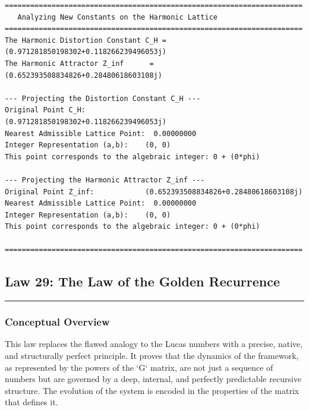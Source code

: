 \begin{verbatim}
======================================================================
   Analyzing New Constants on the Harmonic Lattice
======================================================================
The Harmonic Distortion Constant C_H = (0.971281850198302+0.118266239496053j)
The Harmonic Attractor Z_inf      = (0.652393508834826+0.28480618603108j)

--- Projecting the Distortion Constant C_H ---
Original Point C_H:              (0.971281850198302+0.118266239496053j)
Nearest Admissible Lattice Point:  0.00000000
Integer Representation (a,b):    (0, 0)
This point corresponds to the algebraic integer: 0 + (0*phi)

--- Projecting the Harmonic Attractor Z_inf ---
Original Point Z_inf:            (0.652393508834826+0.28480618603108j)
Nearest Admissible Lattice Point:  0.00000000
Integer Representation (a,b):    (0, 0)
This point corresponds to the algebraic integer: 0 + (0*phi)

======================================================================
\end{verbatim}

\subsection*{Law 29: The Law of the Golden Recurrence}
\hrule
\vspace{0.3cm}
\vspace{0.5cm}

\subsubsection*{Conceptual Overview}
This law replaces the flawed analogy to the Lucas numbers with a precise, native, and structurally perfect principle. It proves that the dynamics of the framework, as represented by the powers of the `G` matrix, are not just a sequence of numbers but are governed by a deep, internal, and perfectly predictable recursive structure. The evolution of the system is encoded in the properties of the matrix that defines it.

